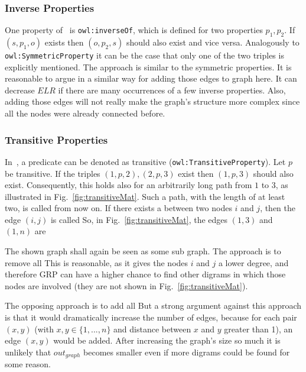 \subsubsection{Inverse Properties}\label{sec:approachInverse}

One property of~\cite{owl} is {\tt owl:inverseOf}, which is defined for two properties $p_1, p_2$. If $(s,p_1,o)$ exists then $(o,p_2,s)$ should also exist and vice versa. Analogously to {\tt owl:SymmetricProperty} it can be the case that only one of the two triples is explicitly mentioned. The approach is similar to the symmetric properties. It is reasonable to argue in a similar way for adding those edges to graph here. It can decrease $ELR$ if there are many occurrences of a few inverse properties. Also, adding those edges will not really make the graph's structure more complex since all the nodes were already connected before. 


\subsubsection{Transitive Properties}\label{sec:approachTransitive}


In~\cite{owl}, a predicate can be denoted as transitive ({\tt owl:TransitiveProperty}). Let $p$ be transitive. If the triples $(1,p,2),(2,p,3)$ exist then $(1,p,3)$ should also exist. Consequently, this holds also for an arbitrarily long path from $1$ to $3$, as illustrated in Fig.~\ref{fig:transitiveMat}. Such a path, with the length of at least two, is called \tp from now on. If there exists a \tp between two nodes $i$ and $j$, then the edge $(i,j)$ is called \dtpp So, in Fig.~\ref{fig:transitiveMat}, the edges $(1,3)$ and $(1,n)$ are \dtpsp

The shown graph shall again be seen as some sub graph. The approach is to remove all \dtpsp This is reasonable, as it gives the nodes $i$ and $j$ a lower degree, and therefore GRP can have a higher chance to find other digrams in which those nodes are involved (they are not shown in Fig.~\ref{fig:transitiveMat}). 

The opposing approach is to add all \dtpsp But a strong argument against this approach is that it would dramatically increase the number of edges, because for each pair $(x,y)$ (with $x,y\in \{1,...,n\} $  and distance between $x$ and $y$ greater than 1), an edge $(x,y)$ would be added. After increasing the graph's size so much it is unlikely that $out_{graph}$ becomes smaller even if more digrams could be found for some reason. 

